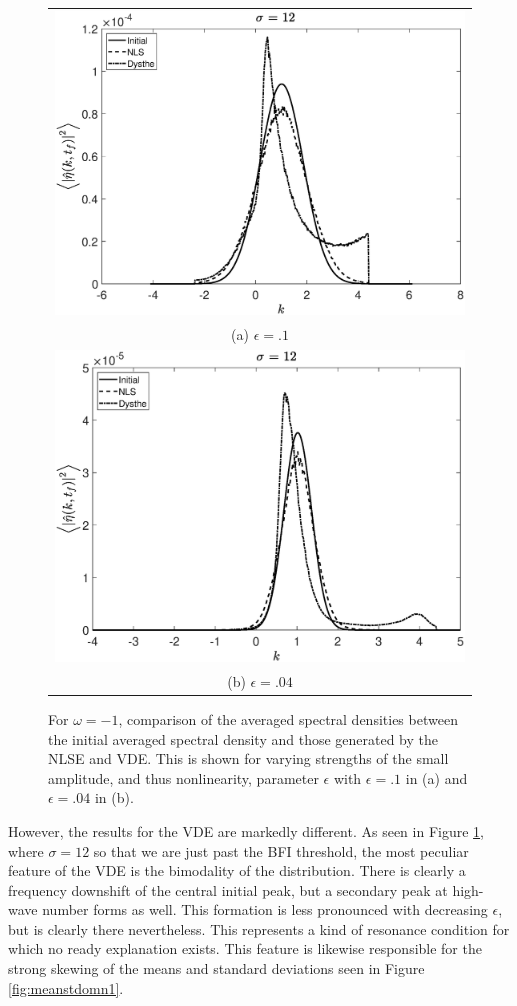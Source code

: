 \documentclass[a4paper,11pt]{article}
\begin{document}
\begin{figure}[!ht]
\centering
\begin{tabular}{c}
\includegraphics[width=.65\textwidth]{omega_n1_ep0pt1_dt5en4_width12} \\
(a) $\epsilon=.1$\\
\includegraphics[width=.65\textwidth]{omega_n1_ep0pt04_width12}\\
(b) $\epsilon=.04$ 
\end{tabular}
\caption{For $\omega=-1$, comparison of the averaged spectral densities between the initial averaged spectral density and those generated by the NLSE and VDE.  This is shown for varying strengths of the small amplitude, and thus nonlinearity, parameter $\epsilon$ with $\epsilon=.1$ in (a) and $\epsilon=.04$ in (b).}
\label{fig:pspecomn1}
\end{figure}

However, the results for the VDE are markedly different.  As seen in Figure \ref{fig:pspecomn1}, where $\sigma=12$ so that we are just past the BFI threshold, the most peculiar feature of the VDE is the bimodality of the distribution.  There is clearly a frequency downshift of the central initial peak, but a secondary peak at high-wave number forms as well.  This formation is less pronounced with decreasing $\epsilon$, but is clearly there nevertheless.  This represents a kind of resonance condition for which no ready explanation exists. This feature is likewise responsible for the strong skewing of the means and standard deviations seen in Figure \ref{fig:meanstdomn1}.
\end{document}
